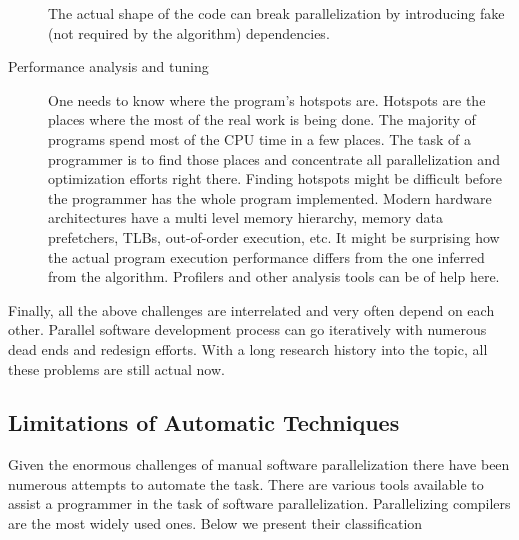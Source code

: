 \begin{description}
The actual shape of the code can break parallelization by introducing fake (not required by the algorithm) dependencies.
\item[Performance analysis and tuning] One needs to know where the program's hotspots are. Hotspots are the places where the most of the real work is being done. The majority of programs spend most of the CPU time in a few places. The task of a programmer is to find those places and concentrate all parallelization and optimization efforts right there. Finding hotspots might be difficult before the programmer has the whole program implemented. Modern hardware architectures have a multi level memory hierarchy, memory data prefetchers, TLBs, out-of-order execution, etc. It might be surprising how the actual program execution performance differs from the one inferred from the algorithm. Profilers and other analysis tools can be of help here.
\end{description}
\quad Finally, all the above challenges are interrelated and very often depend on each other. Parallel software development process can go iteratively with numerous dead ends and redesign efforts. With a long research history into the topic, all these problems are still actual now.

\subsection{Limitations of Automatic Techniques}
\label{background_challenges_automatic}
\quad Given the enormous challenges of manual software parallelization there have been numerous attempts to automate the task. There are various tools available to assist a programmer in the task of software parallelization. Parallelizing compilers are the most widely used ones. Below we present their classification

